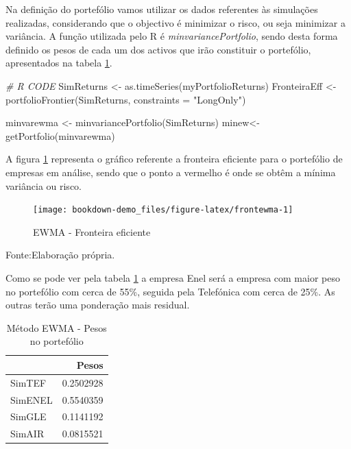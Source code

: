 \documentclass[
  12pt,
  a4paper,
  openany]{book}
\newenvironment{Shaded}{\begin{snugshade}}{\end{snugshade}}
\newcommand{\AttributeTok}[1]{\textcolor[rgb]{0.77,0.63,0.00}{#1}}
\newcommand{\CommentTok}[1]{\textcolor[rgb]{0.56,0.35,0.01}{\textit{#1}}}
\newcommand{\FunctionTok}[1]{\textcolor[rgb]{0.00,0.00,0.00}{#1}}
\newcommand{\NormalTok}[1]{#1}
\newcommand{\OtherTok}[1]{\textcolor[rgb]{0.56,0.35,0.01}{#1}}
\newcommand{\StringTok}[1]{\textcolor[rgb]{0.31,0.60,0.02}{#1}}
\theoremstyle{definition}
\theoremstyle{definition}
\theoremstyle{definition}
\theoremstyle{remark}
\begin{document}
Na definição do portefólio vamos utilizar os dados referentes às simulações realizadas, considerando que o objectivo é minimizar o risco, ou seja minimizar a variância. A função utilizada pelo R é \emph{minvariancePortfolio}, sendo desta forma definido os pesos de cada um dos activos que irão constituir o portefólio, apresentados na tabela \ref{tab:pewma}.

\scriptsize

\begin{Shaded}
\begin{Highlighting}[]
\CommentTok{\# R CODE}
\NormalTok{SimReturns }\OtherTok{\textless{}{-}} \FunctionTok{as.timeSeries}\NormalTok{(myPortfolioReturns)}
\NormalTok{FronteiraEff }\OtherTok{\textless{}{-}} \FunctionTok{portfolioFrontier}\NormalTok{(SimReturns, }\AttributeTok{constraints =} \StringTok{"LongOnly"}\NormalTok{)}

\NormalTok{minvarewma }\OtherTok{\textless{}{-}} \FunctionTok{minvariancePortfolio}\NormalTok{(SimReturns) }
\NormalTok{minew}\OtherTok{\textless{}{-}}\FunctionTok{getPortfolio}\NormalTok{(minvarewma)}
\end{Highlighting}
\end{Shaded}

\normalsize

A figura \ref{fig:frontewma} representa o gráfico referente a fronteira eficiente para o portefólio de empresas em análise, sendo que o ponto a vermelho é onde se obtêm a mínima variância ou risco.

\begin{figure}

{\centering \texttt{[image: bookdown-demo\_files/figure-latex/frontewma-1]} 

}

\caption{EWMA - Fronteira eficiente}\label{fig:frontewma}
\end{figure}
\FloatBarrier
\centering

Fonte:Elaboração própria.

\justifying
\bigskip

Como se pode ver pela tabela \ref{tab:pewma} a empresa Enel será a empresa com maior peso no portefólio com cerca de 55\%, seguida pela Telefónica com cerca de 25\%. As outras terão uma ponderação mais residual.

\begin{table}[!h]

\caption{\label{tab:pewma}Método EWMA - Pesos no portefólio}
\centering
\begin{tabular}[t]{lr}
\toprule
  & Pesos\\
\midrule
SimTEF & 0.2502928\\
SimENEL & 0.5540359\\
SimGLE & 0.1141192\\
SimAIR & 0.0815521\\
\bottomrule
\end{tabular}
\end{table}
\FloatBarrier
\centering
\end{document}
